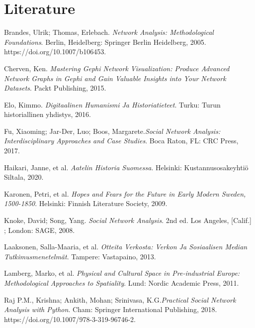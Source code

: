 \documentclass[a4paper,12pt]{article}
\begin{document}
\section{Literature}
\begin{description}
	\item Brandes, Ulrik; Thomas, Erlebach. \textit{Network Analysis: Methodological Foundations}. Berlin, Heidelberg: Springer Berlin Heidelberg, 2005. https://doi.org/10.1007/b106453.
	\item Cherven, Ken. \textit{Mastering Gephi Network Visualization: Produce Advanced Network Graphs in Gephi and Gain Valuable Insights into Your Network Datasets}. Packt Publishing, 2015. 
	\item Elo, Kimmo. \textit{Digitaalinen Humanismi Ja Historiatieteet}. Turku: Turun historiallinen yhdistys, 2016. 
	\item Fu, Xiaoming; Jar-Der, Luo; Boos, Margarete.\textit{Social Network Analysis: Interdisciplinary Approaches and Case Studies}. Boca Raton, FL: CRC Press, 2017.
	\item Haikari, Janne, et al. \textit{Aatelin Historia Suomessa}. Helsinki: Kustannusosakeyhtiö Siltala, 2020.
	\item Karonen, Petri, et al. \textit{Hopes and Fears for the Future in Early Modern Sweden, 1500-1850}. Helsinki: Finnish Literature Society, 2009.  
	\item Knoke, David; Song, Yang. \textit{Social Network Analysis}. 2nd ed. Los Angeles, [Calif.] ; London: SAGE, 2008. 
	\item Laaksonen, Salla-Maaria, et al. \textit{Otteita Verkosta: Verkon Ja Sosiaalisen Median Tutkimusmenetelmät}. Tampere: Vastapaino, 2013.
	\item Lamberg, Marko, et al. \textit{Physical and Cultural Space in Pre-industrial Europe: Methodological Approaches to Spatiality}. Lund: Nordic Academic Press, 2011.
	\item Raj P.M., Krishna; Ankith, Mohan; Srinivasa, K.G.\textit{Practical Social Network Analysis with Python}. Cham: Springer International Publishing, 2018. https://doi.org/10.1007/978-3-319-96746-2. 
\end{description}

\printbibliography
\end{document}

